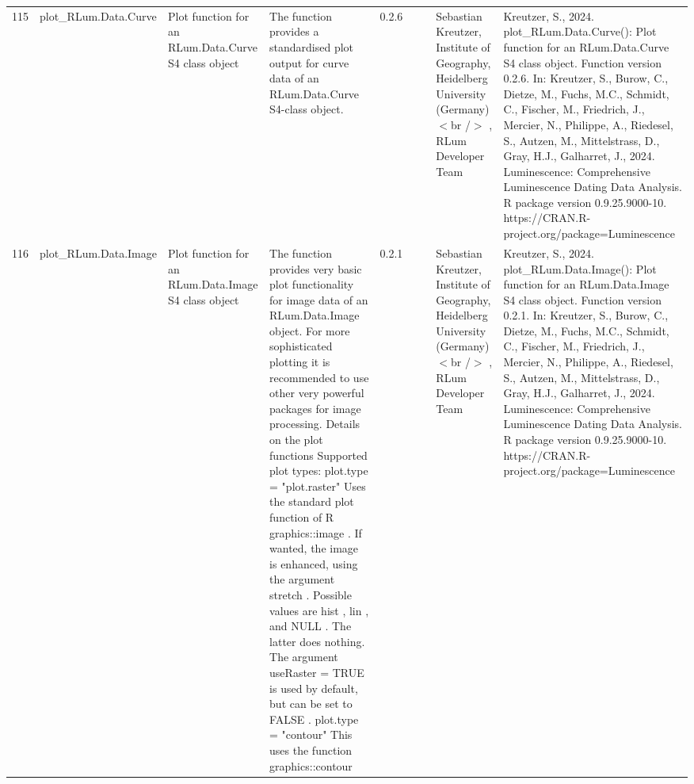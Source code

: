 \begin{table}[ht]
\begin{tabular}{rllllllll}
  115 & plot\_RLum.Data.Curve & Plot function for an RLum.Data.Curve S4 class object & The function provides a standardised plot output for curve data of an RLum.Data.Curve  S4-class object. & 0.2.6
 &  &  & Sebastian Kreutzer, Institute of Geography, Heidelberg University (Germany)$<$br /$>$ , RLum Developer Team & Kreutzer, S., 2024. plot\_RLum.Data.Curve(): Plot function for an RLum.Data.Curve S4 class object. Function version 0.2.6. In: Kreutzer, S., Burow, C., Dietze, M., Fuchs, M.C., Schmidt, C., Fischer, M., Friedrich, J., Mercier, N., Philippe, A., Riedesel, S., Autzen, M., Mittelstrass, D., Gray, H.J., Galharret, J., 2024. Luminescence: Comprehensive Luminescence Dating Data Analysis. R package version 0.9.25.9000-10. https://CRAN.R-project.org/package=Luminescence
 \\ 
  116 & plot\_RLum.Data.Image & Plot function for an  RLum.Data.Image  S4 class object & The function provides very basic plot functionality for image data of an RLum.Data.Image  object. For more sophisticated plotting it is recommended to use other very powerful packages for image processing.  Details on the plot functions   Supported plot types:  plot.type = "plot.raster"   Uses the standard plot function of R  graphics::image . If wanted, the image is enhanced, using the argument  stretch . Possible values are  hist ,  lin , and NULL . The latter does nothing. The argument  useRaster = TRUE  is used by default, but can be set to  FALSE .  plot.type = "contour"   This uses the function  graphics::contour & 0.2.1
 &  &  & Sebastian Kreutzer, Institute of Geography, Heidelberg University (Germany)$<$br /$>$ , RLum Developer Team & Kreutzer, S., 2024. plot\_RLum.Data.Image(): Plot function for an RLum.Data.Image S4 class object. Function version 0.2.1. In: Kreutzer, S., Burow, C., Dietze, M., Fuchs, M.C., Schmidt, C., Fischer, M., Friedrich, J., Mercier, N., Philippe, A., Riedesel, S., Autzen, M., Mittelstrass, D., Gray, H.J., Galharret, J., 2024. Luminescence: Comprehensive Luminescence Dating Data Analysis. R package version 0.9.25.9000-10. https://CRAN.R-project.org/package=Luminescence
 \\ 

\end{tabular}
\end{table}
